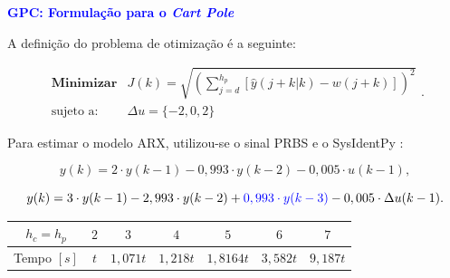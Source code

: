 \documentclass[aspectratio=169]{beamer}
\begin{document}
\begin{frame}{\textcolor{blue}{\textbf{GPC: Formulação para o \textit{Cart Pole}}}}
\vspace{-.5cm}

\justifying A definição do problema de otimização é a seguinte:

\begin{equation}
    \begin{matrix}
        \textbf{Minimizar} & J(k) =\sqrt{(\sum_{j=d}^{h_p} [\hat{y}(j+k|k) - w(j+k)])^2}\\
        \text{sujeto a:} &  \Delta u = \{-2, 0, 2\}
    \end{matrix}.
\end{equation}



\justifying Para estimar o modelo ARX, utilizou-se o sinal PRBS \cite{aguirre2004} e o SysIdentPy \cite{lacerda2020sysidentpy}:

\begin{equation}
    y(k) = 2\cdot y(k-1)- 0,993\cdot y(k-2)  - 0,005\cdot u(k-1),
    \label{eq:28}
\end{equation}


\begin{equation}
y(k)  = 3\cdot y(k-1) - 2,993\cdot y(k-2)  + \color{blue}{0,993\cdot y(k-3)}\color{black}  - 0,005\cdot \Delta u(k-1).
\end{equation}

\begin{table}[H]
    \centering
    \vspace*{-.6cm}
    \begin{tabular}{ccccccc}
        \rowcolor{blue!30} \small $h_c=h_p$ & \small $2$ & \small $3$ & \small $4$ & \small $5$ & \small $6$ & \small $7$ \\
        \hline
        \small Tempo $[s]$ & \small $t$ & \small $1,071t$ & \small $1,218t$ & \small $1,8164t$ & \small $3,582t$ & \small $9,187t$\\ 
        \hline
    \end{tabular}  
    \label{tab:HCcartpole}
\end{table}


\end{frame}

\end{document}
